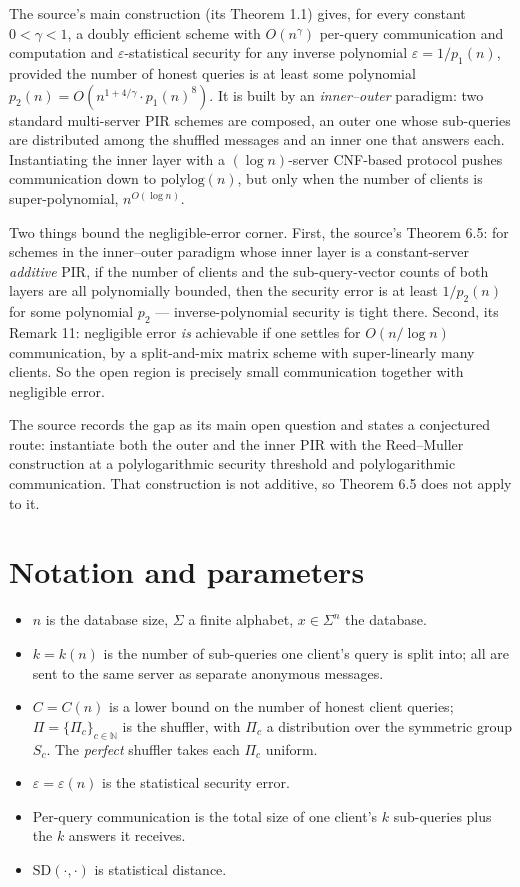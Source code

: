 \documentclass{conjura-conjecture}
\newcommand{\Sig}{\Sigma}
\newcommand{\eps}{\varepsilon}
\newcommand{\SD}{\mathrm{SD}}
\begin{document}
The source's main construction (its Theorem 1.1) gives, for every
constant $0 < \gamma < 1$, a doubly efficient scheme with $O(n^{\gamma})$
per-query communication and computation and $\eps$-statistical security
for any inverse polynomial $\eps = 1/p_{1}(n)$, provided the number of
honest queries is at least some polynomial $p_{2}(n) = O(n^{1 + 4/\gamma}
\cdot p_{1}(n)^{8})$. It is built by an \emph{inner--outer} paradigm:
two standard multi-server PIR schemes are composed, an outer one whose
sub-queries are distributed among the shuffled messages and an inner one
that answers each. Instantiating the inner layer with a $(\log
n)$-server CNF-based protocol pushes communication down to
$\mathrm{polylog}(n)$, but only when the number of clients is
super-polynomial, $n^{O(\log n)}$.

Two things bound the negligible-error corner. First, the source's
Theorem 6.5: for schemes in the inner--outer paradigm whose inner layer
is a constant-server \emph{additive} PIR, if the number of clients and
the sub-query-vector counts of both layers are all polynomially bounded,
then the security error is at least $1/p_{2}(n)$ for some polynomial
$p_{2}$ --- inverse-polynomial security is tight there. Second, its
Remark 11: negligible error \emph{is} achievable if one settles for
$O(n/\log n)$ communication, by a split-and-mix matrix scheme with
super-linearly many clients. So the open region is precisely small
communication together with negligible error.

The source records the gap as its main open question and states a
conjectured route: instantiate both the outer and the inner PIR with the
Reed--Muller construction at a polylogarithmic security threshold and
polylogarithmic communication. That construction is not additive, so
Theorem 6.5 does not apply to it.

\section{Notation and parameters}\label{sec:notation}

\begin{itemize}[nosep]
  \item $n$ is the database size, $\Sig$ a finite alphabet, $x \in
    \Sig^{n}$ the database.
  \item $k = k(n)$ is the number of sub-queries one client's query is
    split into; all are sent to the same server as separate anonymous
    messages.
  \item $C = C(n)$ is a lower bound on the number of honest client
    queries; $\Pi = \{\Pi_{c}\}_{c \in \mathbb{N}}$ is the shuffler,
    with $\Pi_{c}$ a distribution over the symmetric group $S_{c}$. The
    \emph{perfect} shuffler takes each $\Pi_{c}$ uniform.
  \item $\eps = \eps(n)$ is the statistical security error.
  \item Per-query communication is the total size of one client's $k$
    sub-queries plus the $k$ answers it receives.
  \item $\SD(\cdot,\cdot)$ is statistical distance.
\end{itemize}
\end{document}
